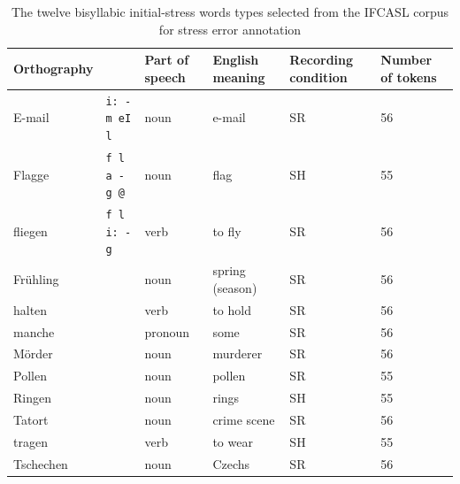 	\begin{table}[htb]
		\centering
		\caption[Word types annotated for lexical stress errors]{The twelve bisyllabic initial-stress words types selected from the IFCASL corpus for stress error annotation %
		}
		
		\begin{tabularx}{\textwidth}{llXXXX}
		\toprule
		
		Orthography & 
		\TODO{Pronunciation} & 
		Part of speech & 
		English \linebreak meaning & 
		Recording condition \TODO{remove?}& 
		Number \linebreak of tokens\\%
		
		\midrule
		E-mail	&	\texttt{i: - m eI l} &	noun &	e-mail &	SR 	&	56	\\
		Flagge	&	\texttt{f l a - g @} &	noun &	 flag &	SH	&	55	\\
		fliegen	&	\texttt{f l i: - g \TODO{@ n}} &	verb &	to fly &	SR		& 56	\\
		Frühling	&	& noun	&	spring \newline (season) &	SR		&	56	\\
		halten	&	&	verb &	to hold &	SR 	&	56	\\
		manche	&	&	pronoun &	some & 	SR 	&	56	\\
		Mörder	&	&	noun &	murderer &	SR 	&	56	\\
		Pollen	&	&	noun &	pollen &	SR 	& 	55	\\
		Ringen	&	&	noun &	rings &	SH	&	55	\\
		Tatort	&	&	noun &	crime scene & 	SR 	&		56	\\
		tragen	&	&	verb &	to wear &	SH	&	55	\\
		Tschechen	&	& noun	&	Czechs	&	SR		& 56	\\
		\bottomrule
		\end{tabularx}
		\label{tab:bisyllwords}
	\end{table}
	
